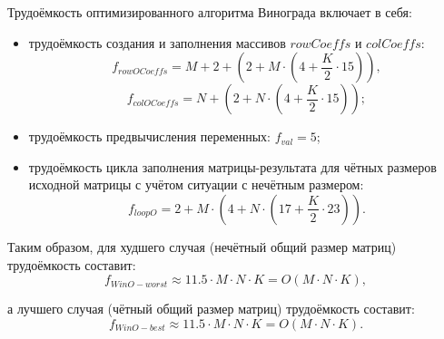 Трудоёмкость оптимизированного алгоритма Винограда включает в себя:
\begin{itemize}
	\item трудоёмкость создания и заполнения массивов $rowCoeffs$ и $colCoeffs$:
	\begin{equation}
		f_{rowOCoeffs} = M + 2 + (2 + M \cdot (4 + \frac{K}{2} \cdot 15)),
	\end{equation}
	\begin{equation}
		f_{colOCoeffs} = N + (2 + N \cdot (4 + \frac{K}{2} \cdot 15));
	\end{equation}
	\item трудоёмкость предвычисления переменных: $f_{val} = 5$;
	\item трудоёмкость цикла заполнения матрицы-результата для чётных размеров исходной матрицы с учётом ситуации с нечётным размером:
	\begin{equation}
		f_{loopO} = 2 + M \cdot (4 + N \cdot (17 + \frac{K}{2} \cdot 23)).
	\end{equation}
\end{itemize}
	
Таким образом, для худшего случая (нечётный общий размер матриц) трудоёмкость составит:
\begin{equation}
	\label{for:bad}
	f_{WinO-worst} \approx 11.5 \cdot M \cdot N \cdot K = O(M \cdot N \cdot K),
\end{equation}

а лучшего случая (чётный общий размер матриц) трудоёмкость составит:
\begin{equation}
	\label{for:good}
	f_{WinO-best} \approx 11.5 \cdot M \cdot N \cdot K = O(M \cdot N \cdot K).
\end{equation}

\newpage